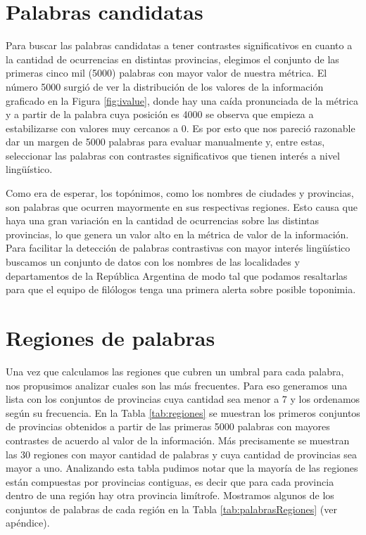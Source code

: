 \section{Palabras candidatas} %
\label{palabras_candidatas}
Para buscar las palabras candidatas a tener contrastes significativos en cuanto a la cantidad de ocurrencias en distintas provincias, elegimos el conjunto de las primeras 
cinco mil (5000) palabras con mayor valor de nuestra métrica. El número 5000 surgió de ver la distribución de los valores de la información graficado en la Figura \ref{fig:ivalue}, donde hay una caída pronunciada de la métrica y a partir de la palabra cuya posición es 4000 se observa que empieza a estabilizarse con valores muy cercanos a 0. Es por esto que nos pareció razonable dar un margen de 5000 palabras para evaluar manualmente y, entre estas, seleccionar las palabras con contrastes significativos que tienen interés a nivel lingüístico.

Como era de esperar, los topónimos, como los nombres de ciudades y provincias, son palabras que ocurren mayormente en sus respectivas regiones. Esto causa que haya una gran variación en 
la cantidad de ocurrencias sobre las distintas provincias, lo que genera un valor alto en la métrica de valor de la información. Para facilitar la detección de palabras contrastivas con 
mayor interés lingüístico buscamos un conjunto de datos con los nombres de las localidades y departamentos de la República Argentina de modo tal que podamos resaltarlas para que el equipo de filólogos tenga una primera alerta sobre posible toponimia.



\section{Regiones de palabras} %
\label{sub:regiones_de_palabras}

Una vez que calculamos las regiones que cubren un umbral para cada palabra, nos propusimos analizar cuales son las más frecuentes. Para eso generamos una lista con los conjuntos de provincias cuya cantidad sea menor a 7 y los ordenamos según su frecuencia. En la Tabla \ref{tab:regiones} se muestran los primeros conjuntos de provincias obtenidos a partir de las primeras 5000 palabras con mayores contrastes de acuerdo al valor de la información. Más precisamente se muestran las 30 regiones con mayor cantidad de palabras y cuya cantidad de provincias sea mayor a uno. Analizando esta tabla pudimos notar que la mayoría de las regiones están compuestas por provincias contiguas, es decir que para cada provincia dentro de una región hay otra provincia limítrofe. Mostramos algunos de los conjuntos de palabras de cada región en la Tabla \ref{tab:palabrasRegiones} (ver apéndice). 

